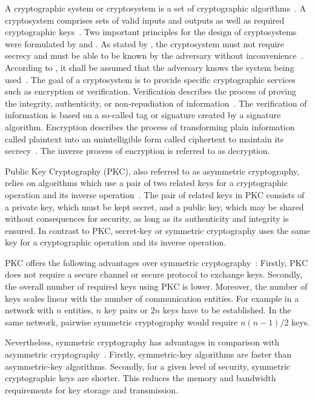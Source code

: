 A cryptographic system or cryptosystem is a set of cryptographic algorithms~\cite{Menezes1996}.
A cryptosystem comprises sets of valid inputs and outputs as well as required cryptographic keys~\cite{Eckert2023}.
Two important principles for the design of cryptosystems were formulated by \citeauthor{Kerckhoffs1883} and \citeauthor{Shannon1949}.
As stated by \citeauthor{Kerckhoffs1883}, the cryptosystem must not require secrecy and must be able to be known by the adversary without inconvenience~\cite{Kerckhoffs1883}.
According to \citeauthor{Shannon1949}, it shall be assumed that the adversary knows the system being used~\cite{Shannon1949}.
The goal of a cryptosystem is to provide specific cryptographic services such as encryption or verification.
Verification describes the process of proving the integrity, authenticity, or non-repudiation of information~\cite{Boneh2023}.
The verification of information is based on a so-called tag or signature created by a signature algorithm.
Encryption describes the process of transforming plain information called plaintext into an unintelligible form called ciphertext to maintain its secrecy~\cite{Barker2016,Boneh2023}.
The inverse process of encryption is referred to as decryption.

Public Key Cryptography (PKC), also referred to as asymmetric cryptography, relies on algorithms which use a pair of two related keys for a cryptographic operation and its inverse operation~\cite{Barker2020,CNSS2022,Eckert2023}.
The pair of related keys in PKC consists of a private key, which must be kept secret, and a public key, which may be shared without consequences for security, as long as its authenticity and integrity is ensured.
In contrast to PKC, secret-key or symmetric cryptography uses the same key for a cryptographic operation and its inverse operation.

PKC offers the following advantages over symmetric cryptography~\cite{Barker2020,Eckert2023}:
Firstly, PKC does not require a secure channel or secure protocol to exchange keys.
Secondly, the overall number of required keys using PKC is lower.
Moreover, the number of keys scales linear with the number of communication entities.
For example in a network with $n$ entities, $n$ key pairs or $2n$ keys have to be established.
In the same network, pairwise symmetric cryptography would require $n(n-1)/2$ keys.

Nevertheless, symmetric cryptography has advantages in comparison with asymmetric cryptography~\cite{Barker2020}.
Firstly, symmetric-key algorithms are faster than asymmetric-key algorithms.
Secondly, for a given level of security, symmetric cryptographic keys are shorter.
This reduces the memory and bandwidth requirements for key storage and transmission.

